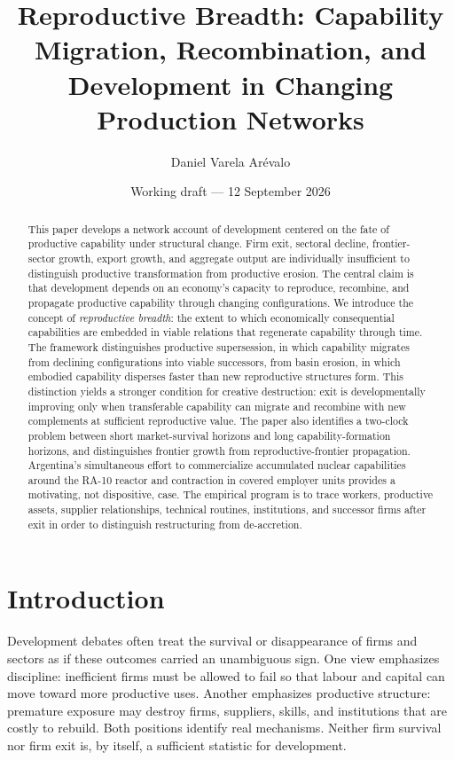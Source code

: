 \documentclass[11pt]{article}
\title{Reproductive Breadth: Capability Migration, Recombination, and Development in Changing Production Networks}
\author{Daniel Varela Ar\'evalo}
\date{Working draft --- 12 September 2026}
\begin{document}
\maketitle

\begin{abstract}
This paper develops a network account of development centered on the fate of productive capability under structural change. Firm exit, sectoral decline, frontier-sector growth, export growth, and aggregate output are individually insufficient to distinguish productive transformation from productive erosion. The central claim is that development depends on an economy's capacity to reproduce, recombine, and propagate productive capability through changing configurations. We introduce the concept of \emph{reproductive breadth}: the extent to which economically consequential capabilities are embedded in viable relations that regenerate capability through time. The framework distinguishes productive supersession, in which capability migrates from declining configurations into viable successors, from basin erosion, in which embodied capability disperses faster than new reproductive structures form. This distinction yields a stronger condition for creative destruction: exit is developmentally improving only when transferable capability can migrate and recombine with new complements at sufficient reproductive value. The paper also identifies a two-clock problem between short market-survival horizons and long capability-formation horizons, and distinguishes frontier growth from reproductive-frontier propagation. Argentina's simultaneous effort to commercialize accumulated nuclear capabilities around the RA-10 reactor and contraction in covered employer units provides a motivating, not dispositive, case. The empirical program is to trace workers, productive assets, supplier relationships, technical routines, institutions, and successor firms after exit in order to distinguish restructuring from de-accretion.
\end{abstract}

\section{Introduction}

Development debates often treat the survival or disappearance of firms and sectors as if these outcomes carried an unambiguous sign. One view emphasizes discipline: inefficient firms must be allowed to fail so that labour and capital can move toward more productive uses. Another emphasizes productive structure: premature exposure may destroy firms, suppliers, skills, and institutions that are costly to rebuild. Both positions identify real mechanisms. Neither firm survival nor firm exit is, by itself, a sufficient statistic for development.
\end{document}
